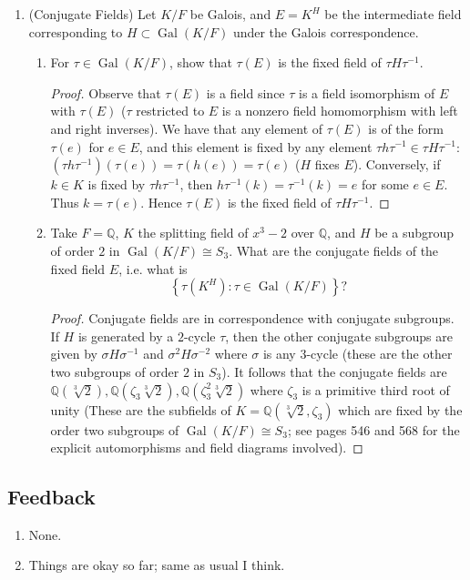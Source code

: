 \documentclass[11pt]{article}
\newcommand{\cbr}[1]{\left\{#1\right\}}
\DeclareMathOperator{\Gal}{Gal}
\begin{document}
\begin{enumerate}
\begin{proof}
        (d) By the Galois correspondence, subfields of the degree $n$ extension $\mathbb{F}$ of $\mathbb{F}_q$ are in bijective correspondence with the subgroups of the Galois group, which is isomorphic to $\mathbb{Z}/n\mathbb{Z}$. But the subgroups of $\mathbb{Z}/n\mathbb{Z}$ are unique and cyclic of order $d$ where $d$ divides $n$. So each divisor $d$ of $n$ determines a unique subgroup, which by the Galois correspondence determines a unique subfield, and vice versa.
    \end{proof}
    \item (Conjugate Fields) Let $K/F$ be Galois, and $E = K^H$ be the intermediate field corresponding to $H\subset\Gal(K/F)$ under the Galois correspondence. \begin{enumerate}
        \item For $\tau\in \Gal(K/F)$, show that $\tau(E)$ is the fixed field of $\tau H\tau^{-1}$. \begin{proof}
            Observe that $\tau(E)$ is a field since $\tau$ is a field isomorphism of $E$ with $\tau(E)$ ($\tau$ restricted to $E$ is a nonzero field homomorphism with left and right inverses). We have that any element of $\tau(E)$ is of the form $\tau(e)$ for $e\in E$, and this element is fixed by any element $\tau h\tau^{-1}\in \tau H\tau^{-1}$: $(\tau h\tau^{-1})(\tau(e)) = \tau(h(e)) = \tau(e)$ ($H$ fixes $E$). Conversely, if $k\in K$ is fixed by $\tau h\tau^{-1}$, then $h\tau^{-1}(k) = \tau^{-1}(k) = e$ for some $e\in E$. Thus $k = \tau(e)$. Hence $\tau(E)$ is the fixed field of $\tau H\tau^{-1}$.
        \end{proof}
        \item Take $F = \mathbb{Q}$, $K$ the splitting field of $x^3-2$ over $\mathbb{Q}$, and $H$ be a subgroup of order $2$ in $\Gal(K/F)\cong S_3$. What are the conjugate fields of the fixed field $E$, i.e. what is \[\cbr{\tau(K^H)\colon \tau\in \Gal(K/F)}?\] \begin{proof}
            Conjugate fields are in correspondence with conjugate subgroups. If $H$ is generated by a $2$-cycle $\tau$, then the other conjugate subgroups are given by $\sigma H \sigma^{-1}$ and $\sigma^2 H \sigma^{-2}$ where $\sigma$ is any $3$-cycle (these are the other two subgroups of order $2$ in $S_3$). It follows that the conjugate fields are $\mathbb{Q}(\sqrt[3]{2}), \mathbb{Q}(\zeta_3\sqrt[3]{2}),\mathbb{Q}(\zeta_3^2\sqrt[3]{2})$ where $\zeta_3$ is a primitive third root of unity (These are the subfields of $K =\mathbb{Q}(\sqrt[3]{2},\zeta_3)$ which are fixed by the order two subgroups of $\Gal(K/F)\cong S_3$; see pages 546 and 568 for the explicit automorphisms and field diagrams involved).
        \end{proof}
    \end{enumerate}
\end{enumerate}
\subsection*{Feedback}
\begin{enumerate}
    \item None.
    \item Things are okay so far; same as usual I think.
\end{enumerate}
\end{document}

